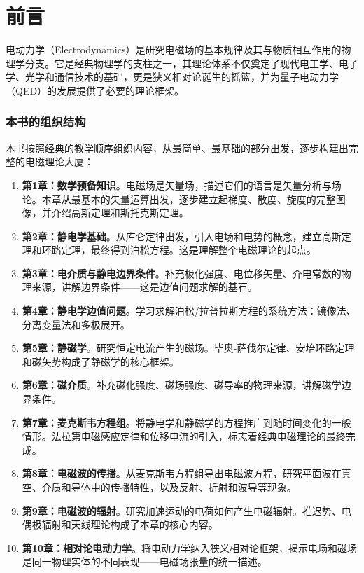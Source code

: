 \documentclass[11pt,a4paper,openany,oneside]{book}
\begin{document}
\newpage





\chapter*{前言}

电动力学（Electrodynamics）是研究电磁场的基本规律及其与物质相互作用的物理学分支。它是经典物理学的支柱之一，其理论体系不仅奠定了现代电工学、电子学、光学和通信技术的基础，更是狭义相对论诞生的摇篮，并为量子电动力学（QED）的发展提供了必要的理论框架。

\subsection*{本书的组织结构}

本书按照经典的教学顺序组织内容，从最简单、最基础的部分出发，逐步构建出完整的电磁理论大厦：

\begin{enumerate}
\item \textbf{第1章：数学预备知识}。电磁场是矢量场，描述它们的语言是矢量分析与场论。本章从最基本的矢量运算出发，逐步建立起梯度、散度、旋度的完整图像，并介绍高斯定理和斯托克斯定理。

\item \textbf{第2章：静电学基础}。从库仑定律出发，引入电场和电势的概念，建立高斯定理和环路定理，最终得到泊松方程。这是理解整个电磁理论的起点。

\item \textbf{第3章：电介质与静电边界条件}。补充极化强度、电位移矢量、介电常数的物理来源，讲解边界条件——这是边值问题求解的基石。

\item \textbf{第4章：静电学边值问题}。学习求解泊松/拉普拉斯方程的系统方法：镜像法、分离变量法和多极展开。

\item \textbf{第5章：静磁学}。研究恒定电流产生的磁场。毕奥-萨伐尔定律、安培环路定理和磁矢势构成了静磁学的核心框架。

\item \textbf{第6章：磁介质}。补充磁化强度、磁场强度、磁导率的物理来源，讲解磁学边界条件。

\item \textbf{第7章：麦克斯韦方程组}。将静电学和静磁学的方程推广到随时间变化的一般情形。法拉第电磁感应定律和位移电流的引入，标志着经典电磁理论的最终完成。

\item \textbf{第8章：电磁波的传播}。从麦克斯韦方程组导出电磁波方程，研究平面波在真空、介质和导体中的传播特性，以及反射、折射和波导等现象。

\item \textbf{第9章：电磁波的辐射}。研究加速运动的电荷如何产生电磁辐射。推迟势、电偶极辐射和天线理论构成了本章的核心内容。

\item \textbf{第10章：相对论电动力学}。将电动力学纳入狭义相对论框架，揭示电场和磁场是同一物理实体的不同表现——电磁场张量的统一描述。
\end{enumerate}
\end{document}
